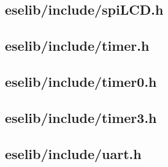 \documentclass[12pt,a4paper,titlepage,oneside]{article}
\begin{document}
\subsection{eselib/include/spiLCD.h}

\newpage
\subsection{eselib/include/timer.h}

\newpage
\subsection{eselib/include/timer0.h}

\newpage
\subsection{eselib/include/timer3.h}

\newpage
\subsection{eselib/include/uart.h}

\newpage
\end{document}
